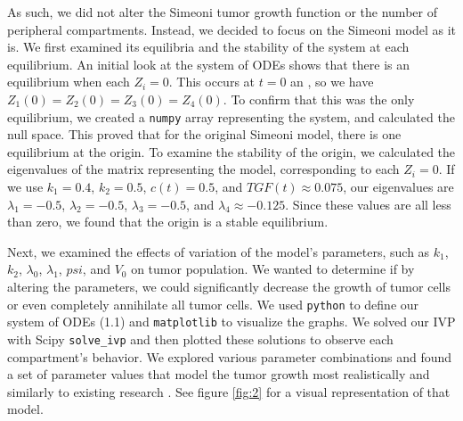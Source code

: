 \documentclass[11pt,reqno]{amsart}
\begin{document}
As such, we did not alter the Simeoni tumor growth function or the number of peripheral compartments. Instead, we decided to focus on the Simeoni model as it is. We first examined its equilibria and the stability of the system at each equilibrium. An initial look at the system of ODEs shows that there is an equilibrium when each $Z_i = 0$. This occurs at $t=0$ an , so we have $Z_1(0) = Z_2(0) = Z_3(0) = Z_4(0)$. To confirm that this was the only equilibrium, we created a \verb!numpy! array representing the system, and calculated the null space. This proved that for the original Simeoni model, there is one equilibrium at the origin. To examine the stability of the origin, we calculated the eigenvalues of the matrix representing the model, corresponding to each $Z_i = 0$. If we use $k_1 = 0.4$, $k_2 = 0.5$, $c(t) = 0.5$, and $TGF(t) \approx 0.075$, our eigenvalues are $\lambda_1 = -0.5$, $\lambda_2 = -0.5$, $\lambda_3 = -0.5$, and $\lambda_4 \approx -0.125$. Since these values are all less than zero, we found that the origin is a stable equilibrium.

Next, we examined the effects of variation of the model’s parameters, such as $k_1$, $k_2$, $\lambda_0$, $\lambda_1$, $psi$, and $V_0$ on tumor population. We wanted to determine if by altering the parameters, we could significantly decrease the growth of tumor cells or even completely annihilate all tumor cells. We used \verb!python! to define our system of ODEs (1.1) and \verb!matplotlib! to visualize the graphs. We solved our IVP with Scipy \verb!solve_ivp! and then plotted these solutions to observe each compartment's behavior. We explored various parameter combinations and found a set of parameter values that model the tumor growth most realistically and similarly to existing research \cite{Koziol_Falls_Schnitzer_2020}. See figure \ref{fig:2} for a visual representation of that model. 
\end{document}
